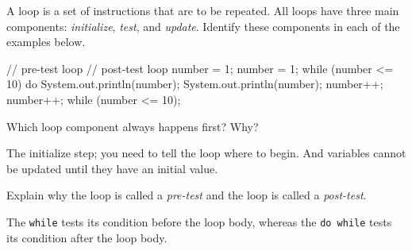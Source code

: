 
A loop is a set of instructions that are to be repeated.
All loops have three main components: \emph{initialize}, \emph{test}, and \emph{update}.
Identify these components in each of the examples below.

\vspace{1ex}
\begin{javalst}
    // pre-test loop                         // post-test loop
    number = 1;                              number = 1;
    while (number <= 10) {                   do {
        System.out.println(number);              System.out.println(number);
        number++;                                number++;
    }                                        } while (number <= 10);
\end{javalst}

\vspace{2pt}
\hspace{3em}
\hspace{9em}




\Q Which loop component always happens first? Why?

\begin{answer}
The initialize step; you need to tell the loop where to begin.
And variables cannot be updated until they have an initial value.
\end{answer}


\Q Explain why the  loop is called a \emph{pre-test} and the  loop is called a \emph{post-test}.

\begin{answer}
The \texttt{while} tests its condition before the loop body, whereas the \texttt{do while} tests its condition after the loop body.
\end{answer}


